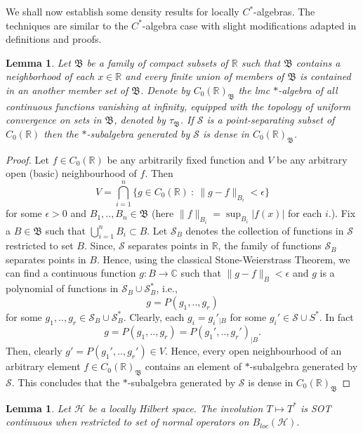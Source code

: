 \documentclass[10pt]{article}
\newtheorem{lemma}[theorem]{Lemma}
\theoremstyle{definition}
\begin{document}
	We shall now establish some density results for locally $C^*$-algebras. The techniques are similar to the $C^*$-algebra case with slight modifications adapted in definitions and proofs.
	
	\begin{lemma}
		Let $\mathfrak B$ be a family of compact subsets of $\mathbb R$ such that $\mathfrak B$ contains a neighborhood of each $x\in \mathbb R$ and every finite union of members of $\mathfrak B$ is contained in an another member set of $\mathfrak B$. Denote by $C_0(\mathbb R)_{\mathfrak B}$ the {\emph{lmc}} $*$-algebra of all continuous functions vanishing at infinity, equipped with the topology of uniform convergence on sets in $\mathfrak B$, denoted by $\tau_\mathfrak B$. If $\mathcal S$ is a point-separating subset of $C_0(\mathbb R)$ then the $*$-subalgebra generated by $\mathcal S$ is dense in $C_0(\mathbb R)_\mathfrak B$.
	\end{lemma}
	\begin{proof}
		Let $f\in C_0(\mathbb R)$ be any arbitrarily fixed function and $V$ be any arbitrary open (basic) neighbourhood of $f$. Then $$V=\bigcap_{i=1}^n\bigl\{g\in C_0(\mathbb R)~:~\|g-f\|_{B_i}<\epsilon\bigr\}$$
		for some $\epsilon>0$ and $B_1,..,B_n\in \mathfrak B$ (here $\|f\|_{B_i}=\sup_{B_i}|f(x)|$ for each $i$.). Fix a $B\in \mathfrak B$ such that $\bigcup_{i=1}^n B_i\subset B$. Let $\mathcal S_{B}$ denotes the collection of functions in $\mathcal S$ restricted to set $B$.  Since, $\mathcal S$ separates points in $\mathbb R$, the family of functions $\mathcal S_B$ separates points in $B$. Hence, using the classical Stone-Weierstrass Theorem, we can find a continuous function $g:B\to \mathbb C$ such that $\|g-f\|_B<\epsilon$ and $g$ is a polynomial of functions in $\mathcal S_B\cup \mathcal S_B^*$, i.e., $$g=P(g_1,..,g_r)$$ for some $g_1,..,g_r\in \mathcal S_B\cup \mathcal S_B^*$. Clearly, each $g_i={g_i}'_{|B}$ for some $g_i'\in \mathcal S\cup S^*$. In fact $$g=P(g_1,..,g_r)=P(g_1',..,g_r')_{|B}.$$
		Then, clearly $g'=P(g_1',..,g_r')\in V$. Hence, every open neighbourhood of an arbitrary element $f\in C_0(\mathbb R)_{\mathfrak B}$ contains an element of $*$-subalgebra generated by $\mathcal S$. This concludes that the $*$-subalgebra generated by $\mathcal S$ is dense in $C_0(\mathbb R)_{\mathfrak B}$
	\end{proof}
	\begin{lemma}\label{invocont}
		Let $\mathcal H$ be a locally Hilbert space. The involution $T\mapsto T^*$ is SOT continuous when restricted to set of normal operators on $B_{loc}(\mathcal H)$.
	\end{lemma}
\end{document}
